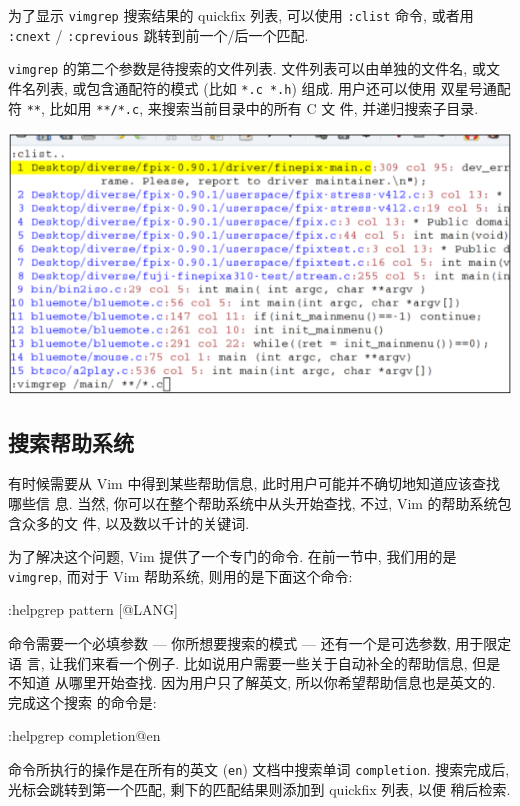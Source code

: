 \begin{warning}
    为了显示 \texttt{vimgrep} 搜索结果的 quickfix 列表, 可以使用 \texttt{:clist}
    命令, 或者用 \texttt{:cnext} / \texttt{:cprevious} 跳转到前一个/后一个匹配.
\end{warning}

\texttt{vimgrep} 的第二个参数是待搜索的文件列表. 文件列表可以由单独的文件名,
或文件名列表, 或包含通配符的模式 (比如 \texttt{*.c *.h}) 组成. 用户还可以使用
双星号通配符 \texttt{**}, 比如用 \texttt{**/*.c}, 来搜索当前目录中的所有 C 文
件, 并递归搜索子目录.
\begin{center}
    \includegraphics[scale=0.7]{./images/page66.png}
\end{center}
\subsection{搜索帮助系统}
\label{subsec:search_the_help_system}

有时候需要从 Vim 中得到某些帮助信息, 此时用户可能并不确切地知道应该查找哪些信
息. 当然, 你可以在整个帮助系统中从头开始查找, 不过, Vim 的帮助系统包含众多的文
件, 以及数以千计的关键词.

为了解决这个问题, Vim 提供了一个专门的命令. 在前一节中, 我们用的是
\texttt{vimgrep}, 而对于 Vim 帮助系统, 则用的是下面这个命令:
\begin{vimcode}
:helpgrep pattern [@LANG]
\end{vimcode}
命令需要一个必填参数 --- 你所想要搜索的模式 --- 还有一个是可选参数, 用于限定语
言, 让我们来看一个例子. 比如说用户需要一些关于自动补全的帮助信息, 但是不知道
从哪里开始查找. 因为用户只了解英文, 所以你希望帮助信息也是英文的. 完成这个搜索
的命令是:
\begin{vimcode}
:helpgrep completion@en
\end{vimcode}
命令所执行的操作是在所有的英文 (\texttt{en}) 文档中搜索单词 \texttt{completion}.
搜索完成后, 光标会跳转到第一个匹配, 剩下的匹配结果则添加到 quickfix 列表, 以便
稍后检索.

